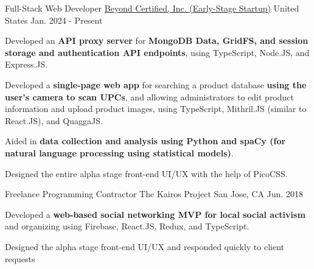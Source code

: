 

\begin{cventries}

  \cventry
    {Full-Stack Web Developer} %
    {\href{https://beyondcertified.info/}{Beyond Certified, Inc. (Early-Stage Startup)}} %
    {United States} %
    {Jan. 2024 - Present} %
    {
      \begin{cvitems} %
        \item {Developed an \textbf{API proxy server} for \textbf{MongoDB Data, GridFS, and session storage and authentication API endpoints}, using TypeScript, Node.JS, and Express.JS.}
        \item {Developed a \textbf{single-page web app} for searching a product database \textbf{using the user's camera to scan UPCs}, and allowing administrators to edit product information and upload product images, using TypeScript, Mithril.JS (similar to React.JS), and QuaggaJS.}
        \item {Aided in \textbf{data collection and analysis using Python and spaCy (for natural language processing using statistical models)}.}
        \item {Designed the entire alpha stage front-end UI/UX with the help of PicoCSS.}
      \end{cvitems}
    }

    \cventry
    {Freelance Programming Contractor} %
    {The Kairos Project} %
    {San Jose, CA} %
    {Jun. 2018} %
    {
      \begin{cvitems} %
        \item {Developed a \textbf{web-based social networking MVP for local social activism} and organizing using Firebase, React.JS, Redux, and TypeScript.}
        \item {Designed the alpha stage front-end UI/UX and responded quickly to client requests}
      \end{cvitems}
    }

\end{cventries}
